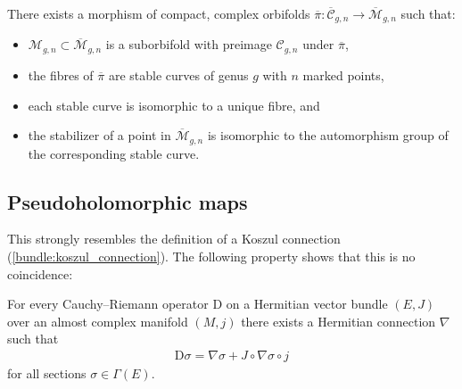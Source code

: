     \begin{property}
        There exists a morphism of compact, complex orbifolds $\overline{\pi}:\overline{\mathcal{C}}_{g,n}\rightarrow\overline{\mathcal{M}}_{g,n}$ such that:
        \begin{itemize}
            \item $\mathcal{M}_{g,n}\subset\overline{\mathcal{M}}_{g,n}$ is a suborbifold with preimage $\mathcal{C}_{g,n}$ under $\overline{\pi}$,
            \item the fibres of $\overline{\pi}$ are stable curves of genus $g$ with $n$ marked points,
            \item each stable curve is isomorphic to a unique fibre, and
            \item the stabilizer of a point in $\overline{\mathcal{M}}_{g,n}$ is isomorphic to the automorphism group of the corresponding stable curve.
        \end{itemize}
    \end{property}

\subsection{Pseudoholomorphic maps}\label{section:stable_maps}

    This strongly resembles the definition of a Koszul connection (\cref{bundle:koszul_connection}). The following property shows that this is no coincidence:
    \begin{property}
        For every Cauchy--Riemann operator $\mathrm{D}$ on a Hermitian vector bundle $(E,J)$ over an almost complex manifold $(M,j)$ there exists a Hermitian connection $\nabla$ such that
        \begin{gather}
            \mathrm{D}\sigma = \nabla\sigma + J\circ\nabla\sigma\circ j
        \end{gather}
        for all sections $\sigma\in\Gamma(E)$.
    \end{property}

